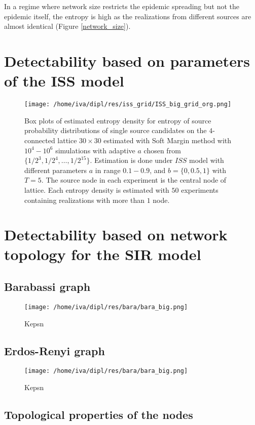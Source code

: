 \documentclass[times, utf8, diplomski]{fer}
\begin{document}
In a regime where network size restricts the epidemic spreading but not the epidemic itself, the entropy is high as the realizations from different sources are almost identical (Figure \ref{network_size}).

\section{Detectability based on parameters of the ISS model}
\begin{figure}[H]
\texttt{[image: /home/iva/dipl/res/iss\_grid/ISS\_big\_grid\_org.png]}
\caption{Box plots of estimated entropy density for entropy of source probability distributions of 
single source candidates on the $4$-connected lattice $30 \times 30$ estimated with Soft Margin method with $10^4 - 10^6$ simulations with adaptive $a$ chosen from $\{1/2^3, 1/2^4, \ldots, 1/2^{15}\}$. Estimation is done under $ISS$ model with different parameters $a$ in range $0.1 - 0.9$, and $b = \{0, 0.5, 1\}$ with $T = 5$. The source node in each experiment is the central node of lattice. Each entropy density is estimated with $50$ experiments containing realizations with more than $1$ node.}
\end{figure}

\section{Detectability based on network topology for the SIR model}
\subsection{Barabassi graph}
\begin{figure}[H]
\texttt{[image: /home/iva/dipl/res/bara/bara\_big.png]}
\caption{Kepsn}
\end{figure}


\subsection{Erdos-Renyi graph}
\begin{figure}[H]
\texttt{[image: /home/iva/dipl/res/bara/bara\_big.png]}
\caption{Kepsn}
\end{figure}

\subsection{Topological properties of the nodes}
\end{document}

